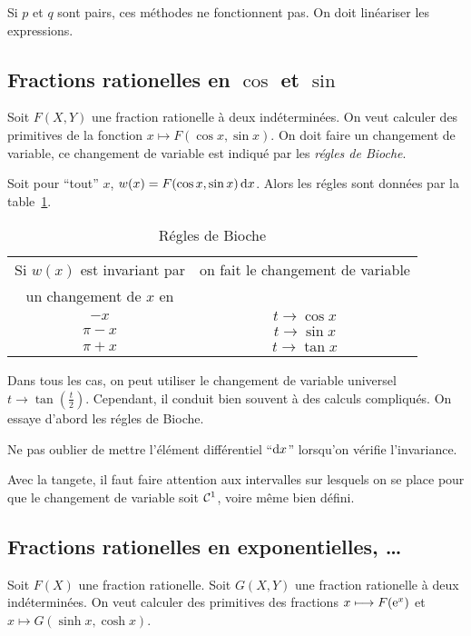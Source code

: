 Si \(p\) et \(q\) sont pairs, ces méthodes ne fonctionnent pas. On doit 
linéariser les expressions.

\subsection{Fractions rationelles en \(\cos\) et \(\sin\)}

Soit \(F(X,Y)\) une fraction rationelle à deux indéterminées. On veut calculer 
des primitives de la fonction \(x \longmapsto F(\cos x,\sin x)\). On doit faire 
un changement de variable, ce changement de variable est indiqué par les 
\emph{régles de Bioche}.

Soit pour ``tout'' \(x\), \(w(x) = F(\cos x,\sin x)\mathop{}\mathopen{}\mathrm{d} x\). Alors les régles 
sont données par la table~\ref{tab:bioche}.
\begin{table}[!h]
  \centering
  \begin{tabular}{|c|c|}\hline
    Si \(w(x)\) est invariant par & on fait le changement de variable \\
    un changement de \(x\) en &  \\ \hline
    \(-x\) & \(t \to \cos x\)\\
    \(\pi-x\) & \(t \to \sin x\)\\
    \(\pi+x\) & \(t \to \tan x\)\\
  \hline\end{tabular}
  \caption{Régles de Bioche}
  \label{tab:bioche}
\end{table}

Dans tous les cas, on peut utiliser le changement de variable universel \(t \to 
\tan\left(\frac{t}{2}\right)\). Cependant, il conduit bien souvent à des calculs 
compliqués. On essaye d'abord les régles de Bioche.

\danger Ne pas oublier de mettre l'élément différentiel ``\(\mathop{}\mathopen{}\mathrm{d} x\)'' 
lorsqu'on vérifie l'invariance.

\danger Avec la tangete, il faut faire attention aux intervalles sur lesquels on 
se place pour que le changement de variable soit \(\mathcal{C}^{1}\), voire même bien 
défini.

\subsection{Fractions rationelles en exponentielles, \ldots}

Soit \(F(X)\) une fraction rationelle. Soit \(G(X,Y)\) une fraction rationelle à 
deux indéterminées. On veut calculer des primitives des fractions \(x 
\longmapsto F(\operatorname{e}^x)\) et \(x \longmapsto G(\sinh x,\cosh x)\).

